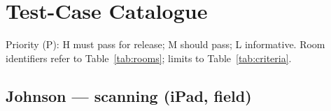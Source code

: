 \documentclass[conference,a4paper,10pt]{IEEEtran}
\begin{document}
\onecolumn
\appendices

\section{Test-Case Catalogue}\label{app:cases}

Priority (P): H must pass for release; M should pass; L informative. Room
identifiers refer to Table~\ref{tab:rooms}; limits to
Table~\ref{tab:criteria}.

\setlength{\LTpre}{4pt}
\setlength{\LTpost}{6pt}
\footnotesize

\subsection{Johnson --- scanning (iPad, field)}\label{app:johnson}
\end{document}
